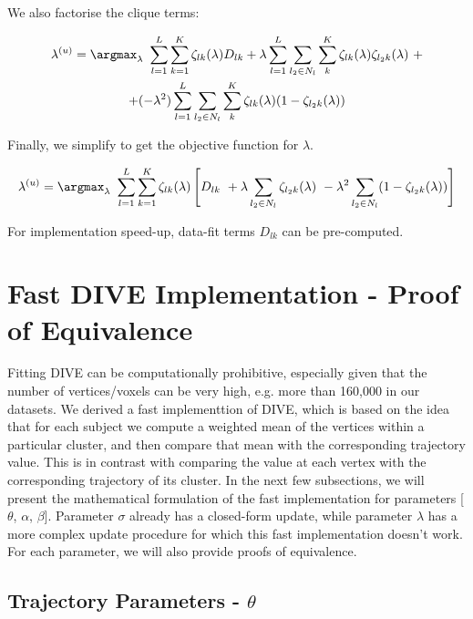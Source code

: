 We also factorise the clique terms:

\begin{multline}
\lambda^{(u)} = \argmax_{\lambda}\ \sum_{l=1}^L \sum_{k=1}^K \zeta_{lk}(\lambda) D_{lk} + \lambda \sum_{l = 1}^{L} \sum_{l_2 \in N_l} \sum_{k}^K   \zeta_{lk}(\lambda) \zeta_{l_2k}(\lambda)\ + \\ + (-\lambda^2) \sum_{l = 1}^{L} \sum_{l_2 \in N_l} \sum_{k}^K \zeta_{lk}(\lambda) (1- \zeta_{l_2k}(\lambda))
\end{multline}

Finally, we simplify to get the objective function for $\lambda$.

\begin{equation}
 \lambda^{(u)} = \argmax_{\lambda}\ \sum_{l=1}^L \sum_{k=1}^K \zeta_{lk}(\lambda) \left[  D_{lk} \  + \lambda \sum_{l_2 \in N_l}  \zeta_{l_2 k}(\lambda)\  -\lambda^2 \sum_{l_2 \in N_l} (1- \zeta_{l_2 k}(\lambda))  \right]
\end{equation}

For implementation speed-up, data-fit terms $D_{lk}$ can be pre-computed.


\section{Fast DIVE Implementation - Proof of Equivalence}
\label{sec:appDivFas}

Fitting DIVE can be computationally prohibitive, especially given that the number of vertices/voxels can be very high, e.g. more than 160,000 in our datasets. We derived a fast implementtion of DIVE, which is based on the idea that for each subject we compute a weighted mean of the vertices within a particular cluster, and then compare that mean with the corresponding trajectory value. This is in contrast with comparing the value at each vertex with the corresponding trajectory of its cluster. In the next few subsections, we will present the mathematical formulation of the fast implementation for parameters [$\theta$, $\alpha$, $\beta$]. Parameter $\sigma$ already has a closed-form update, while parameter $\lambda$ has a more complex update procedure for which this fast implementation doesn't work. For each parameter, we will also provide proofs of equivalence.

\subsection{Trajectory Parameters - $\theta$}

